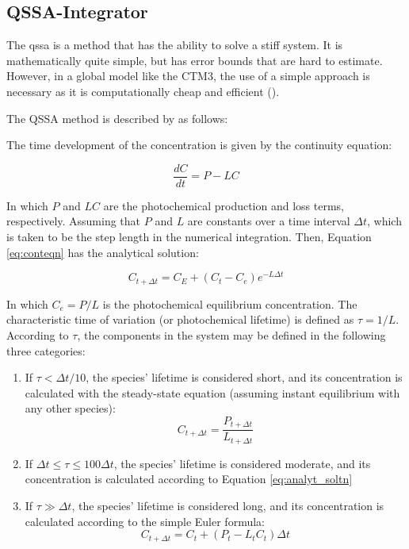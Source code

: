 \subsection{QSSA-Integrator}\label{sec:QSSA}

The \acrshort{qssa} is a method that has the ability to solve a stiff system. It is mathematically quite simple, but has error bounds that are hard to estimate. However, in a global model like the CTM3, the use of a simple approach is necessary as it is computationally cheap and efficient (\cite{Hesstvedt1978}). 

\medskip

The QSSA method is described by \cite{Hesstvedt1978} as follows: 

\medskip

The time development of the concentration is given by the continuity equation:

\begin{equation}
    \frac{dC}{dt} = P - LC
    \label{eq:conteqn}
\end{equation}

In which $P$ and $LC$ are the photochemical production and loss terms, respectively. Assuming that $P$ and $L$ are constants over a time interval $\Delta t$, which is taken to be the step length in the numerical integration. Then, Equation \ref{eq:conteqn} has the analytical solution: 

\begin{equation}
    C_{t + \Delta t} = C_{E} + (C_{t} - C_{e})e^{-L\Delta t}
    \label{eq:analyt_soltn}
\end{equation}

In which $C_{e} = P/L$ is the photochemical equilibrium concentration. The characteristic time of variation (or photochemical lifetime) is defined as $\tau = 1/L$. According to $\tau$, the components in the system may be defined in the following three categories: 

\begin{enumerate}[label=(\roman*)]
    \item If $\tau < \Delta t/10$, the species' lifetime is considered short, and its concentration is calculated with the steady-state equation (assuming instant equilibrium with any other species):
    \begin{equation}
        C_{t + \Delta t} = \frac{P_{t + \Delta t}}{L_{t + \Delta t}}
        \label{eq:a}
    \end{equation}
    \item If $\Delta t \leq \tau \leq 100\Delta t$, the species' lifetime is considered moderate, and its concentration is calculated according to Equation \ref{eq:analyt_soltn}
    \item If $\tau \gg \Delta t$, the species' lifetime is considered long, and its concentration is calculated according to the simple Euler formula: 
    \begin{equation}
        C_{t + \Delta t} = C_t + (P_t - L_tC_t)\Delta t
        \label{eq:b}
    \end{equation}
\end{enumerate}

